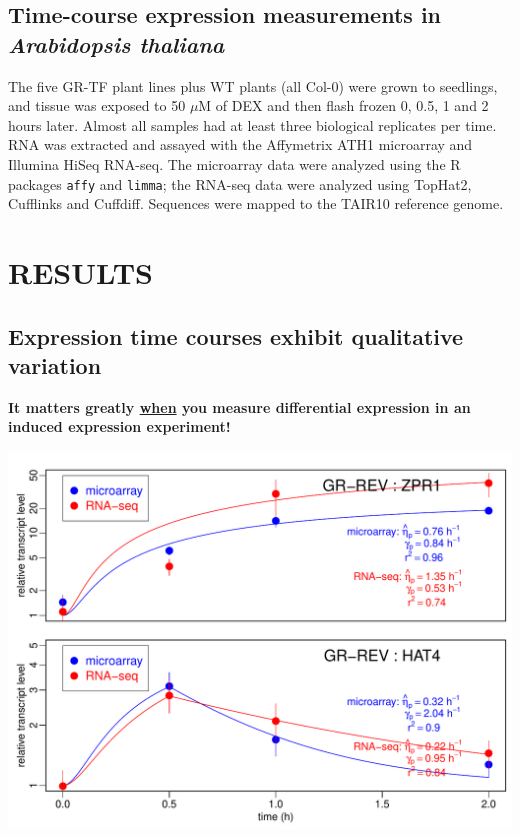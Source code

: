 \documentclass[aspb,landscape]{a0poster}
\newlength{\figwidth}
\newlength{\figtopspace}
\begin{document}
\begin{multicols}{3}
  \subsection*{Time-course expression measurements in {\it Arabidopsis thaliana}}

  The five GR-TF plant lines plus WT plants (all Col-0) were grown to seedlings, and tissue was exposed to 50 $\mu$M of DEX and then flash frozen 0, 0.5, 1 and 2 hours later.
  Almost all samples had at least three biological replicates per time. RNA was extracted and assayed with the Affymetrix ATH1 microarray and Illumina HiSeq RNA-seq.
  The microarray data were analyzed using the R packages \texttt{affy} and \texttt{limma}; the RNA-seq data were analyzed using TopHat2, Cufflinks and Cuffdiff.
  Sequences were mapped to the TAIR10 reference genome. 


  \section*{RESULTS}

  \subsection*{Expression time courses exhibit qualitative variation}

  \textbf{It matters greatly \underline{when} you measure differential expression in an induced expression experiment!}
  
  \begin{center}\vspace{\figtopspace}
    \includegraphics[width=\figwidth]{ZPR1-HAT4}
  \end{center}


\end{multicols}
\end{document}
